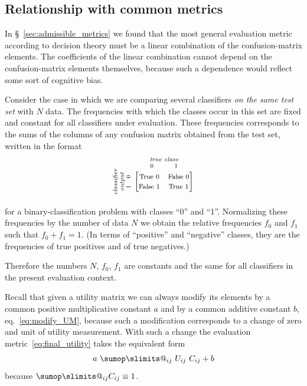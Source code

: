 \documentclass[\ifafour a4paper,12pt,\else a5paper,10pt,\fi%
onecolumn,oneside,article,%
british%
]{memoir}
\makeatletter
\theoremstyle{remark}
\theoremstyle{innote}
\def\sum{\DOTSI\sumop\slimits@}
\renewcommand*{\|}[1][]{\nonscript\:#1\vert\nonscript\:\mathopen{}}
\newcommand*{\sect}{\S}%
\newcommand*{\eqn}{eq.}%
\makeatother
\begin{document}
\subsection{Relationship with common metrics}
\label{sec:common_metrics}

In \sect~\ref{sec:admissible_metrics} we found that the most general evaluation metric according to decision theory must be a linear combination of the confusion-matrix elements. The coefficients of the linear combination cannot depend on the confusion-matrix elements themselves, because such a dependence would reflect some sort of cognitive bias.

Consider the case in which we are comparing several classifiers \emph{on the same test set} with $N$ data. The frequencies with which the classes occur in this set are fixed and constant for all classifiers under evaluation. These frequencies corresponds to the sums of the columns of any confusion matrix obtained from the test set, written in the format
\begin{equation*}
  \rotatebox[origin=c]{90}{
    \textit{\parbox{\widthof{classifier}}{\centering\scriptsize classifier\\output\\$1\quad 0$}}
    }\ 
    \overbracket[0pt]{
      \begin{bmatrix}
    \text{\footnotesize True 0} & \text{\footnotesize False 0}\\
    \text{\footnotesize False 1} & \text{\footnotesize True 1}\\
      \end{bmatrix}}^{
      \textit{\parbox{\widthof{\scriptsize true class}}{\centering\scriptsize true class\\$0\hspace{3em}1$}}
    }
\end{equation*}
for a binary-classification problem with classes \enquote{0} and \enquote{1}. Normalizing these frequencies by the number of data $N$ we obtain the relative frequencies $f_{0}$ and $f_{1}$ such that $f_{0} + f_{1} = 1$. (In terms of \enquote{positive} and \enquote{negative} classes, they are the frequencies of true positives and of true negatives.)

Therefore the numbers $N$, $f_{0}$, $f_{1}$ are constants and the same for all classifiers in the present evaluation context.

Recall that given a utility matrix we can always modify its elements by a common positive multiplicative constant $a$ and by a common additive constant $b$, \eqn~\eqref{eq:modify_UM}, because such a modification corresponds to a change of zero and unit of utility measurement. With such a change the evaluation metric~\eqref{eq:final_utility} takes the equivalent form
\begin{equation}
  \label{eq:final_utility_modified}
 a\ \sum_{ij} \ U_{ij}\ C_{ij} + b
\end{equation}
because $\sum_{ij} C_{ij} \equiv 1$.
\end{document}
